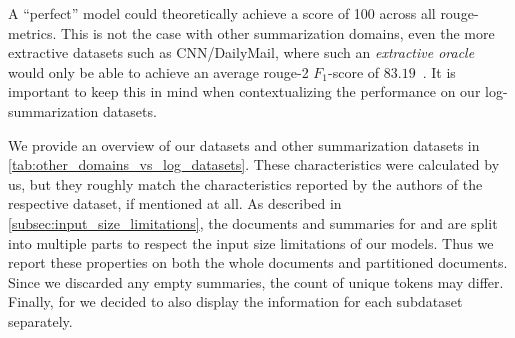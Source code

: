 A \enquote{perfect} model could theoretically achieve a score of 100 across all \acs*{rouge}-metrics.
This is not the case with other summarization domains,
even the more extractive datasets such as CNN/DailyMail,
where such an \emph{extractive oracle} would only be able to achieve an average \acs*{rouge}-2 \(F_1\)-score of \(83.19\)~\parencite[547]{summarization_critical_evaluation}.
It is important to keep this in mind when contextualizing the performance on our log-summarization datasets.

We provide an overview of our datasets and other summarization datasets in \autoref{tab:other_domains_vs_log_datasets}.
These characteristics were calculated by us, but they roughly match the characteristics reported by the authors of the respective dataset,
if mentioned at all.
As described in \autoref{subsec:input_size_limitations}, the documents and summaries for \hadoop{} and \telco{}
are split into multiple parts to respect the input size limitations of our models.
Thus we report these properties on both the whole documents and partitioned documents.
Since we discarded any empty summaries, the count of unique tokens may differ.
Finally, for \logsummary{} we decided to also display the information for each subdataset separately.

